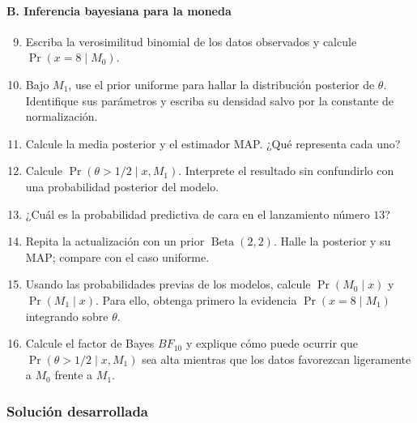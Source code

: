 \paragraph*{B. Inferencia bayesiana para la moneda}
\begin{enumerate}
  \setcounter{enumi}{8}
  \item Escriba la verosimilitud binomial de los datos observados y calcule $\Pr(x=8\mid M_0)$.
  \item Bajo $M_1$, use el prior uniforme para hallar la distribución posterior de $\theta$. Identifique sus parámetros y escriba su densidad salvo por la constante de normalización.
  \item Calcule la media posterior y el estimador MAP. ¿Qué representa cada uno?
  \item Calcule $\Pr(\theta>1/2\mid x,M_1)$. Interprete el resultado sin confundirlo con una probabilidad posterior del modelo.
  \item ¿Cuál es la probabilidad predictiva de cara en el lanzamiento número $13$?
  \item Repita la actualización con un prior $\operatorname{Beta}(2,2)$. Halle la posterior y su MAP; compare con el caso uniforme.
  \item Usando las probabilidades previas de los modelos, calcule $\Pr(M_0\mid x)$ y $\Pr(M_1\mid x)$. Para ello, obtenga primero la evidencia $\Pr(x=8\mid M_1)$ integrando sobre $\theta$.
  \item Calcule el factor de Bayes $BF_{10}$ y explique cómo puede ocurrir que $\Pr(\theta>1/2\mid x,M_1)$ sea alta mientras que los datos favorezcan ligeramente a $M_0$ frente a $M_1$.
\end{enumerate}

\subsubsection*{Solución desarrollada}

